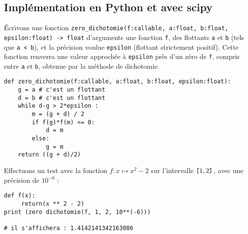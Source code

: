 %
%
%
% 
%
%


\subsection{Implémentation en Python et avec scipy}
\'Ecrivons une fonction \lstinline{zero_dichotomie(f:callable, a:float, b:float, epsilon:float) -> float} d'arguments une fonction \lstinline{f}, des flottants \lstinline{a} et \lstinline{b} (tels que \lstinline{a < b}), et  la précision voulue \lstinline{epsilon} (flottant strictement positif). Cette fonction renverra une valeur approchée à \lstinline{epsilon} près d'un zéro de \lstinline{f}, compris entre \lstinline{a} et \lstinline{b}, obtenue par la méthode de dichotomie.

\begin{lstlisting}
def zero_dichotomie(f:callable, a:float, b:float, epsilon:float):
    g = a # c'est un flottant
    d = b # c'est un flottant
    while d-g > 2*epsilon :
        m = (g + d) / 2
        if f(g)*f(m) <= 0:
            d = m
        else:
            g = m
    return ((g + d)/2)
\end{lstlisting}

Effectuons un test avec la fonction $f : x \mapsto x^2-2$ sur l'intervalle $\verb![!1,2\verb!]!$, avec une précision de $10^{-6}$ :
 
\begin{lstlisting}
def f(x):
     return(x ** 2 - 2)
print (zero dichotomie(f, 1, 2, 10**(-6)))

# il s'affichera : 1.4142141342163086
\end{lstlisting}
%
% 

